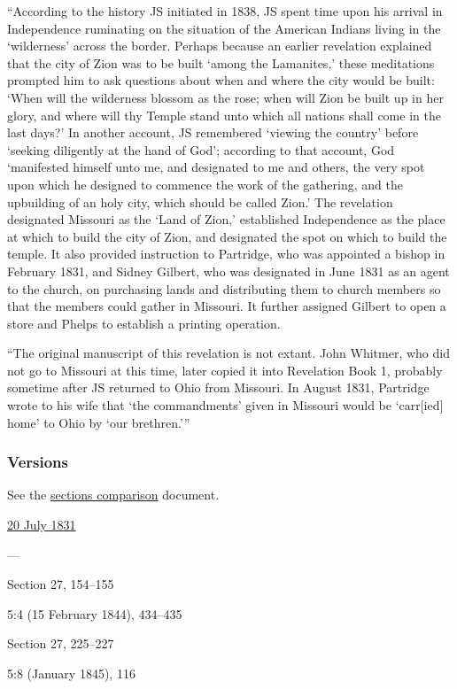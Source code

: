 			``According to the history JS initiated in 1838, JS spent time upon his arrival in Independence ruminating on the situation of the American Indians living in the `wilderness' across the border. Perhaps because an earlier revelation explained that the city of Zion was to be built `among the Lamanites,' these meditations prompted him to ask questions about when and where the city would be built: `When will the wilderness blossom as the rose; when will Zion be built up in her glory, and where will thy Temple stand unto which all nations shall come in the last days?' In another account, JS remembered `viewing the country' before `seeking diligently at the hand of God'; according to that account, God `manifested himself unto me, and designated to me and others, the very spot upon which he designed to commence the work of the gathering, and the upbuilding of an holy city, which should be called Zion.' The revelation designated Missouri as the `Land of Zion,' established Independence as the place at which to build the city of Zion, and designated the spot on which to build the temple. It also provided instruction to Partridge, who was appointed a bishop in February 1831, and Sidney Gilbert, who was designated in June 1831 as an agent to the church, on purchasing lands and distributing them to church members so that the members could gather in Missouri. It further assigned Gilbert to open a store and Phelps to establish a printing operation.
			
			``The original manuscript of this revelation is not extant. John Whitmer, who did not go to Missouri at this time, later copied it into Revelation Book 1, probably sometime after JS returned to Ohio from Missouri. In August 1831, Partridge wrote to his wife that `the commandments' given in Missouri would be `carr[ied] home' to Ohio by `our brethren.'''
		
	\subsubsection{Versions}
		\label{DC57-V}
		
		See the \href{https://drive.google.com/file/d/1goAvNz8jS4R8slYfMG_db55Ty2z_vmgK/view?usp=sharing}{sections comparison} document.
	
		\begin{compactdesc}
			\item[JSP] \hyperref[EMS-1831-JS-20-JUL-1831]{20 July 1831}
			\item[BC] ---
			\item[DC 1835] Section 27, 154--155
			\item[TS] 5:4 (15 February 1844), 434--435
			\item[DC 1844] Section 27, 225--227
			\item[MS] 5:8 (January 1845), 116
		\end{compactdesc}

